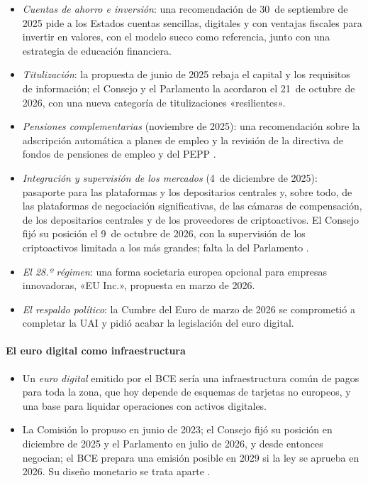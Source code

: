 \documentclass[11pt]{article}
\begin{document}
\begin{itemize}
\item \emph{Cuentas de ahorro e inversión}: una recomendación de 30~de septiembre de 2025 pide a los Estados cuentas sencillas, digitales y con ventajas fiscales para invertir en valores, con el modelo sueco como referencia, junto con una estrategia de educación financiera\nocite{CE2025Cuentas}.
\item \emph{Titulización}: la propuesta de junio de 2025 rebaja el capital y los requisitos de información; el Consejo y el Parlamento la acordaron el 21~de octubre de 2026, con una nueva categoría de titulizaciones «resilientes»\nocite{CE2025Titulizacion,Consejo2026Titulizacion}.
\item \emph{Pensiones complementarias} (noviembre de 2025): una recomendación sobre la adscripción automática a planes de empleo y la revisión de la directiva de fondos de pensiones de empleo y del PEPP\nocite{CE2025Pensiones} .
\item \emph{Integración y supervisión de los mercados} (4~de diciembre de 2025): pasaporte para las plataformas y los depositarios centrales y, sobre todo,  de las plataformas de negociación significativas, de las cámaras de compensación, de los depositarios centrales y de los proveedores de criptoactivos. El Consejo fijó su posición el 9~de octubre de 2026, con la supervisión de los criptoactivos limitada a los más grandes; falta la del Parlamento\nocite{CE2025Integracion,Consejo2026Integracion} .
\item \emph{El 28.º régimen}: una forma societaria europea opcional para empresas innovadoras, «EU Inc.», propuesta en marzo de 2026\nocite{CE2026EUInc}.
\item \emph{El respaldo político}: la Cumbre del Euro de marzo de 2026 se comprometió a completar la UAI y pidió acabar la legislación del euro digital\nocite{CumbreEuro2026}.
\end{itemize}

\paragraph{El euro digital como infraestructura}

\begin{itemize}
\item Un \emph{euro digital} emitido por el BCE sería una infraestructura común de pagos para toda la zona, que hoy depende de esquemas de tarjetas no europeos, y una base para liquidar operaciones con activos digitales.
\item La Comisión lo propuso en junio de 2023; el Consejo fijó su posición en diciembre de 2025 y el Parlamento en julio de 2026, y desde entonces negocian; el BCE prepara una emisión posible en 2029 si la ley se aprueba en 2026\nocite{BCE2025EuroDigital,PE2026EuroDigitalTren}. Su diseño monetario se trata aparte .
\end{itemize}
\end{document}
